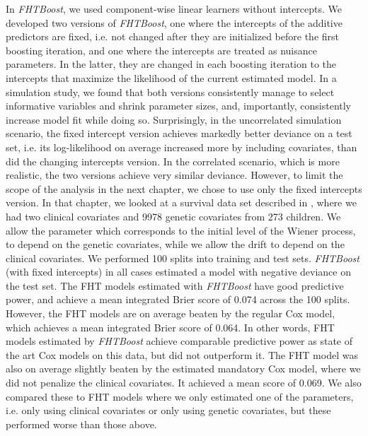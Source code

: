 In \textit{FHTBoost}, we used component-wise linear learners without intercepts.
We developed two versions of \textit{FHTBoost}, one where the intercepts of the additive predictors are fixed, i.e. not changed after they are initialized before the first boosting iteration, and one where the intercepts are treated as nuisance parameters.
In the latter, they are changed in each boosting iteration to the intercepts that maximize the likelihood of the current estimated model.
In a simulation study, we found that both versions consistently manage to select informative variables and shrink parameter sizes, and, importantly, consistently increase model fit while doing so.
Surprisingly, in the uncorrelated simulation scenario, the fixed intercept version achieves markedly better deviance on a test set, i.e. its log-likelihood on average increased more by including covariates, than did the changing intercepts version.
In the correlated scenario, which is more realistic, the two versions achieve very similar deviance.
However, to limit the scope of the analysis in the next chapter, we chose to use only the fixed intercepts version.
In that chapter, we looked at a survival data set described in \citet{oberthuer-data}, where we had two clinical covariates and 9978 genetic covariates from 273 children.
We allow the parameter which corresponds to the initial level of the Wiener process, to depend on the genetic covariates, while we allow the drift to depend on the clinical covariates.
We performed 100 splits into training and test sets.
\textit{FHTBoost} (with fixed intercepts) in all cases estimated a model with negative deviance on the test set.
The FHT models estimated with \textit{FHTBoost} have good predictive power, and achieve a mean integrated Brier score of 0.074 across the 100 splits.
However, the FHT models are on average beaten by the regular Cox model, which achieves a mean integrated Brier score of 0.064.
In other words, FHT models estimated by \textit{FHTBoost} achieve comparable predictive power as state of the art Cox models on this data, but did not outperform it.
The FHT model was also on average slightly beaten by the estimated mandatory Cox model, where we did not penalize the clinical covariates.
It achieved a mean score of 0.069.
We also compared these to FHT models where we only estimated one of the parameters, i.e. only using clinical covariates or only using genetic covariates, but these performed worse than those above.

